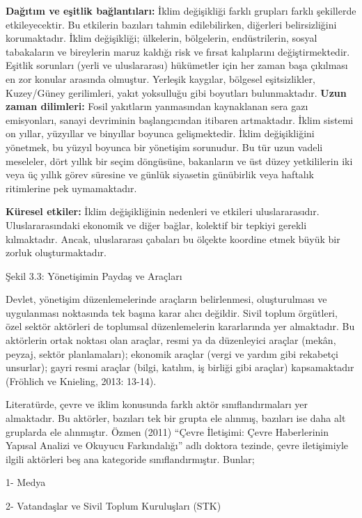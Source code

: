 \documentclass[
]{book}
\begin{document}
\textbf{Dağıtım ve eşitlik bağlantıları:} İklim değişikliği farklı grupları farklı şekillerde etkileyecektir. Bu etkilerin bazıları tahmin edilebilirken, diğerleri belirsizliğini korumaktadır. İklim değişikliği; ülkelerin, bölgelerin, endüstrilerin, sosyal tabakaların ve bireylerin maruz kaldığı risk ve fırsat kalıplarını değiştirmektedir. Eşitlik sorunları (yerli ve uluslararası) hükümetler için her zaman başa çıkılması en zor konular arasında olmuştur. Yerleşik kaygılar, bölgesel eşitsizlikler, Kuzey/Güney gerilimleri, yakıt yoksulluğu gibi boyutları bulunmaktadır.
\textbf{Uzun zaman dilimleri:} Fosil yakıtların yanmasından kaynaklanan sera gazı emisyonları, sanayi devriminin başlangıcından itibaren artmaktadır. İklim sistemi on yıllar, yüzyıllar ve binyıllar boyunca gelişmektedir. İklim değişikliğini yönetmek, bu yüzyıl boyunca bir yönetişim sorunudur. Bu tür uzun vadeli meseleler, dört yıllık bir seçim döngüsüne, bakanların ve üst düzey yetkililerin iki veya üç yıllık görev süresine ve günlük siyasetin günübirlik veya haftalık ritimlerine pek uymamaktadır.

\textbf{Küresel etkiler:} İklim değişikliğinin nedenleri ve etkileri uluslararasıdır. Uluslararasındaki ekonomik ve diğer bağlar, kolektif bir tepkiyi gerekli kılmaktadır. Ancak, uluslararası çabaları bu ölçekte koordine etmek büyük bir zorluk oluşturmaktadır.

Şekil 3.3: Yönetişimin Paydaş ve Araçları

Devlet, yönetişim düzenlemelerinde araçların belirlenmesi, oluşturulması ve uygulanması noktasında tek başına karar alıcı değildir. Sivil toplum örgütleri, özel sektör aktörleri de toplumsal düzenlemelerin kararlarında yer almaktadır. Bu aktörlerin ortak noktası olan araçlar, resmi ya da düzenleyici araçlar (mekân, peyzaj, sektör planlamaları); ekonomik araçlar (vergi ve yardım gibi rekabetçi unsurlar); gayri resmi araçlar (bilgi, katılım, iş birliği gibi araçlar) kapsamaktadır (Fröhlich ve Knieling, 2013: 13-14).

Literatürde, çevre ve iklim konusunda farklı aktör sınıflandırmaları yer almaktadır. Bu aktörler, bazıları tek bir grupta ele alınmış, bazıları ise daha alt gruplarda ele alınmıştır. Özmen (2011) ``Çevre İletişimi: Çevre Haberlerinin Yapısal Analizi ve Okuyucu Farkındalığı'' adlı doktora tezinde, çevre iletişimiyle ilgili aktörleri beş ana kategoride sınıflandırmıştır. Bunlar;

1- Medya

2- Vatandaşlar ve Sivil Toplum Kuruluşları (STK)
\end{document}
